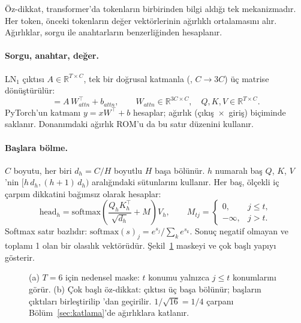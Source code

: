 Öz-dikkat, transformer'da tokenların birbirinden bilgi aldığı tek mekanizmadır. Her token, önceki tokenların değer vektörlerinin ağırlıklı ortalamasını alır. Ağırlıklar, sorgu ile anahtarların benzerliğinden hesaplanır.

\paragraph{Sorgu, anahtar, değer.} LN$_1$ çıktısı $A \in \mathbb{R}^{T\times C}$, tek bir doğrusal katmanla (, $C\rightarrow3C$) üç matrise dönüştürülür:
\begin{equation}
  [\,Q \;|\; K \;|\; V\,] = A\, W_{attn}^{\top} + b_{attn}, \qquad W_{attn} \in \mathbb{R}^{3C \times C}, \quad Q, K, V \in \mathbb{R}^{T \times C}.
\end{equation}
PyTorch'un  katmanı $y = xW^\top + b$ hesaplar; ağırlık (çıkış~$\times$~giriş) biçiminde saklanır. Donanımdaki ağırlık ROM'u da bu satır düzenini kullanır.

\paragraph{Başlara bölme.} $C$ boyutu, her biri $d_h = C/H$ boyutlu $H$ başa bölünür. $h$ numaralı baş $Q$, $K$, $V$'nin $[h\,d_h, (h+1)\,d_h)$ aralığındaki sütunlarını kullanır. Her baş, ölçekli iç çarpım dikkatini bağımsız olarak hesaplar:
\begin{equation}
  \mathrm{head}_h = \mathrm{softmax}\!\left( \frac{Q_h K_h^{\top}}{\sqrt{d_h}} + M \right) V_h, \qquad
  M_{tj} = \begin{cases} 0, & j \le t, \\ -\infty, & j > t. \end{cases}
\end{equation}
Softmax satır bazlıdır: $\mathrm{softmax}(s)_j = e^{s_j} / \sum_k e^{s_k}$. Sonuç negatif olmayan ve toplamı 1 olan bir olasılık vektörüdür. Şekil~\ref{fig:dikkat} maskeyi ve çok başlı yapıyı gösterir.

\begin{figure}[t]
  \centering
  \caption[Nedensel maske ve çok başlı öz-dikkat]{(a) $T=6$ için nedensel maske: $t$ konumu yalnızca $j \le t$ konumlarını görür. (b) Çok başlı öz-dikkat:  çıktısı üç başa bölünür; başların çıktıları birleştirilip 'dan geçirilir. $1/\sqrt{16}=1/4$ çarpanı Bölüm~\ref{sec:katlama}'de ağırlıklara katlanır.}
  \label{fig:dikkat}
\end{figure}

